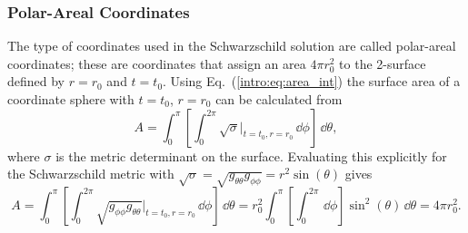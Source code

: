 \subsubsection*{Polar-Areal Coordinates }
The type of coordinates used in the Schwarzschild solution are called polar-areal coordinates; these are coordinates that assign an area $4\pi r_0^2$ to the 2-surface defined by $r=r_0$ and $t=t_0$. Using Eq.~(\ref{intro:eq:area_int}) the surface area of a coordinate sphere with $t=t_0$, $r=r_0$ can be calculated from
\begin{equation}
A=\int_0^\pi\left[\int_0^{2\pi} \sqrt{\sigma}\Big|_{t=t_0,r=r_0} \,\dd \phi\right] \,\dd \theta,
\end{equation}
where $\sigma$ is the metric determinant on the surface. Evaluating this explicitly for the Schwarzschild metric with $\sqrt{\sigma} = \sqrt{g_{\theta\theta}  g_{\phi\phi}} = r^2 \sin(\theta)$ gives
\begin{equation}
A=\int_0^\pi\left[\int_0^{2\pi} \sqrt{g_{\phi\phi} g_{\theta\theta}}\Big|_{t=t_0,r=r_0} \,\dd \phi\right] \,\dd \theta=  r_0^2 \int_0^\pi\left[\int_0^{2\pi} \,\dd \phi\right]  \sin^2(\theta)\,\dd \theta = 4 \pi r_0^2.
\end{equation}




